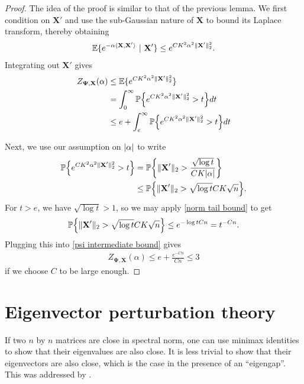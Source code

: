 \documentclass[final,12pt]{colt2018} %
\numberwithin{equation}{section}
\DeclarePairedDelimiter{\abs}{\lvert}{\rvert}
\DeclarePairedDelimiter{\norm}{\lVert}{\rVert}
\DeclarePairedDelimiter{\braces}{\lbrace}{\rbrace}
\DeclarePairedDelimiter{\inprod}{\langle}{\rangle}
\renewcommand{\P}{\mathbb{P}}
\newcommand{\E}{\mathbb{E}}
\newcommand{\boldPsi}{\boldsymbol{\Psi}}
\newcommand{\boldX}{\textbf{X}}
\newcommand{\st}{\ | \ }
\begin{document}
\begin{proof}
	The idea of the proof is similar to that of the previous lemma. We first condition on $\boldX'$ and use the sub-Gaussian nature of $\boldX$ to bound its Laplace transform, thereby obtaining
	\begin{align*}
	\E\braces{e^{-\alpha\inprod{\boldX,\boldX'}} \st \boldX' } \leq e^{CK^2\alpha^2\norm{\boldX'}_2^2}.
	\end{align*}
	Integrating out $\boldX'$ gives
	\begin{align} \label{psi intermediate bound}
	Z_{\boldPsi,\boldX}(\alpha) & \leq \E \braces{e^{CK^2\alpha^2\norm{\boldX'}_2^2}} \nonumber \\
	& = \int_0^\infty \P\braces*{e^{CK^2\alpha^2\norm{\boldX'}_2^2} > t} dt \nonumber \\
	& \leq e + \int_e^\infty \P\braces*{e^{CK^2\alpha^2\norm{\boldX'}_2^2} > t} dt
	\end{align}
	
	Next, we use our assumption on $\abs{\alpha}$ to write
	\begin{align}
	\P\braces*{e^{CK^2\alpha^2\norm{\boldX'}_2^2} > t} & = \P\braces*{\norm{\boldX'}_2 > \frac{\sqrt{\log t}}{CK\abs{\alpha}} } \nonumber \\
	& \leq \P\braces*{\norm{\boldX'}_2 > \sqrt{\log t}CK\sqrt{n} }.
	\end{align}
	For $t > e$, we have $\sqrt{\log t} > 1$, so we may apply \eqref{norm tail bound} to get
	\begin{align}
	\P\braces*{\norm{\boldX'}_2 > \sqrt{\log t}CK\sqrt{n} } \leq e^{-\log t Cn} = t^{-Cn}.
	\end{align}
	Plugging this into \eqref{psi intermediate bound} gives
	\begin{align}
	Z_{\boldPsi,\boldX}(\alpha) \leq e + \frac{e^{-Cn}}{Cn} \leq 3
	\end{align}
	if we choose $C$ to be large enough.
\end{proof}

\section{Eigenvector perturbation theory} \label{eigenvector perturbation}

If two $n$ by $n$ matrices are close in spectral norm, one can use minimax identities to show that their eigenvalues are also close. It is less trivial to show that their eigenvectors are also close, which is the case in the presence of an ``eigengap''. This was addressed by \cite{Davis1970a}.
\end{document}
